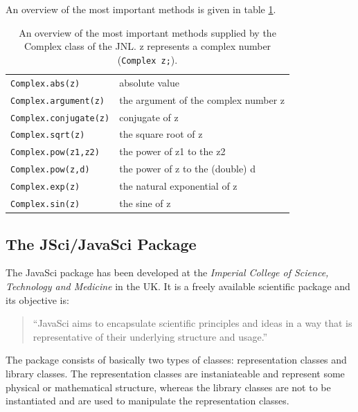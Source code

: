 An overview of the most important methods is given in table 
\ref{tab:JNLComplex}.
\begin{table}[htbp]
  \begin{center}
    \begin{tabular}{l|l}
      \verb|Complex.abs(z)| & absolute value \\
      \verb|Complex.argument(z)| & the argument of the complex number z \\
      \verb|Complex.conjugate(z)| & conjugate of z  \\
      \verb|Complex.sqrt(z)| & the square root of z \\
      \verb|Complex.pow(z1,z2)| & the power of z1 to the z2\\
      \verb|Complex.pow(z,d)| & the power of z to the (double) d\\
      \verb|Complex.exp(z)| & the natural exponential of z \\
      \verb|Complex.sin(z)| & the sine of z \\
    \end{tabular}
    \caption{An overview of the most important methods supplied by the 
      Complex class of the JNL. z represents a complex number 
      (\texttt{Complex z;}).}
    \label{tab:JNLComplex}
  \end{center}
\end{table}


\subsection{The JSci/JavaSci Package}
\label{sec:JSci}
The JavaSci package has been developed at the
\emph{Imperial College of Science, Technology and Medicine} in the UK.
It is a freely available scientific package and its objective is:
\begin{quote}
``JavaSci aims to encapsulate scientific principles and ideas in a way 
that is representative of their underlying structure and usage.''
\end{quote}

The package consists of basically two types of classes: representation 
classes and library classes. The representation classes are instaniateable
and represent some physical or mathematical structure, whereas the
library classes are not to be instantiated and are used to manipulate
the representation classes.

